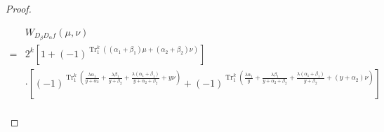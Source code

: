 \documentclass{article}
\newcommand{\0}{\textbf{0}}
\newcommand{\1}{\textbf{1}}
\newcommand{\TRACE}{\operatorname{Tr}_1^k}
\theoremstyle{plain}
\begin{document}
\begin{proof}
\begin{enumerate}[label=\textbf{Case \arabic*},wide = 0pt]
\begin{enumerate}[label=\textbf{Subcase \Alph{*}},itemindent=*,wide=\parindent]
    \begin{align}\label{eq:simpleforms_4}
        &W_{D_{\beta}D_{\alpha}f}(\mu,\nu)\nonumber\\
        =&2^k\left[1+(-1)^{\TRACE\left((\alpha_1+\beta_1)\mu+ (\alpha_2+\beta_2)\nu\right)}\right]\nonumber\\
        &\cdot
        \left[(-1)^{\TRACE\left(\frac{\lambda\alpha_1}{y+\alpha_2}+\frac{\lambda\beta_1}{y+\beta_2}+\frac{\lambda(\alpha_1+\beta_1)}{y+\alpha_2+\beta_2}+ y\nu\right)}+
        (-1)^{\TRACE\left(\frac{\lambda\alpha_1}{y}+\frac{\lambda\beta_1}{y+\alpha_2+\beta_2}+\frac{\lambda(\alpha_1+\beta_1)}{y+\beta_2}+ (y+\alpha_2)\nu\right)}\right]\nonumber\\

\end{align}
\end{enumerate}
\end{enumerate}
\end{proof}
\end{document}
